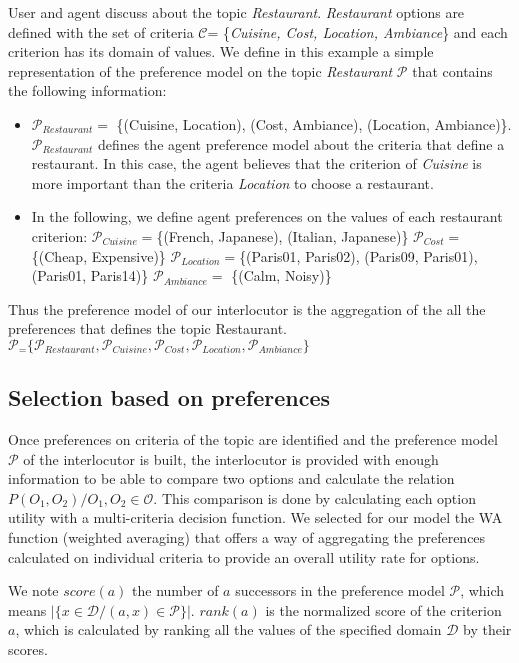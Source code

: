 \documentclass{llncs}
\begin{document}
 
 User and agent discuss about the topic \textit{Restaurant}. \textit{Restaurant} options are defined with the set of criteria $\mathcal{C} $= \{\textit{Cuisine, Cost, Location, Ambiance}\} and each criterion has its domain of values. We define in this example  a simple representation of the  preference model on the topic \textit{Restaurant} $\mathcal{P}$  that contains the following information: 
 \begin{itemize}
 \item $\mathcal{P}_{Restaurant} = $ \{(Cuisine, Location), (Cost, Ambiance), (Location, Ambiance)\}. $\mathcal{P}_{Restaurant}$ defines the agent preference model  about the criteria that define a restaurant. In this case, the agent believes that the criterion of  \textit{Cuisine} is more important than the criteria  \textit{Location} to choose a restaurant.
 \item In the following, we define  agent preferences on the values of each restaurant criterion: 
 \subitem $\mathcal{P}_{Cuisine} = $\{(French, Japanese), (Italian, Japanese)\}
 \subitem $\mathcal{P}_{Cost} = $ \{(Cheap, Expensive)\}
 \subitem $\mathcal{P}_{Location} = $\{(Paris01, Paris02), (Paris09, Paris01), (Paris01, Paris14)\}
  \subitem $\mathcal{P}_{Ambiance} = $ \{(Calm, Noisy)\}
  \end{itemize}
 
 Thus the preference model of our interlocutor is the aggregation of the all the  preferences that defines the topic Restaurant.  \\$\mathcal{P}_= \{\mathcal{P}_{Restaurant}, \mathcal{P}_{Cuisine}, \mathcal{P}_{Cost}, \mathcal{P}_{Location}, \mathcal{P}_{Ambiance}\} $

 \subsection{Selection based on preferences}
\par Once preferences on criteria of the topic are identified and the preference model $\mathcal{P}$ of the interlocutor is built, the interlocutor is provided with enough information to be able to compare two options and calculate the relation 
\\$P(O_1, O_2) / O_1, O_2 \in \mathcal{O} $.
 This comparison is done by calculating each option utility with a multi-criteria decision function. We selected for our model the WA \cite{yager2012ordered} function (weighted averaging) that offers a way of aggregating the preferences calculated on individual criteria to provide an overall utility rate for options. 
  \par We note  $score(a)$ the number of $a$  successors in the preference model $\mathcal{P}$, which means $|\{x \in \mathcal{D} / (a,x) \in \mathcal{P}\}|$. 
  $rank(a)$ is the normalized  score of the criterion $a$, which is calculated by ranking all the values of the specified domain $\mathcal{D}$ by their scores. 
  
\end{document}

